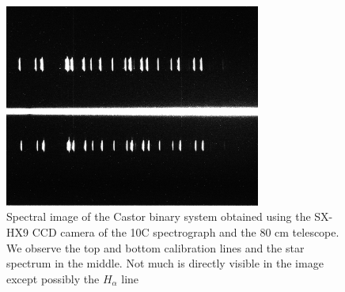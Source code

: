 \documentclass[12pt,a4paper]{article}
\begin{document}
      \begin{figure}[H]
        \centering
        \includegraphics[width=0.75\textwidth]{Pictures/spectrum_image.png}
        \caption{Spectral image of the Castor binary system obtained using the SX-HX9 CCD camera of the 10C spectrograph and the 80 cm telescope. 
        We observe the top and bottom calibration lines and the star spectrum in the middle. Not much is directly visible in the image except possibly the $H_\alpha$ line}
        \label{spectrum_img} 
      \end{figure}
\end{document}
